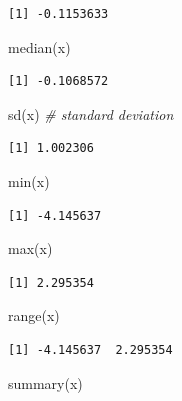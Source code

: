 \documentclass[
]{book}
\newenvironment{Shaded}{\begin{snugshade}}{\end{snugshade}}
\newcommand{\CommentTok}[1]{\textcolor[rgb]{0.56,0.35,0.01}{\textit{#1}}}
\newcommand{\FunctionTok}[1]{\textcolor[rgb]{0.00,0.00,0.00}{#1}}
\newcommand{\NormalTok}[1]{#1}
\begin{document}
\begin{verbatim}
[1] -0.1153633
\end{verbatim}

\begin{Shaded}
\begin{Highlighting}[]
\FunctionTok{median}\NormalTok{(x)}
\end{Highlighting}
\end{Shaded}

\begin{verbatim}
[1] -0.1068572
\end{verbatim}

\begin{Shaded}
\begin{Highlighting}[]
\FunctionTok{sd}\NormalTok{(x) }\CommentTok{\# standard deviation}
\end{Highlighting}
\end{Shaded}

\begin{verbatim}
[1] 1.002306
\end{verbatim}

\begin{Shaded}
\begin{Highlighting}[]
\FunctionTok{min}\NormalTok{(x)}
\end{Highlighting}
\end{Shaded}

\begin{verbatim}
[1] -4.145637
\end{verbatim}

\begin{Shaded}
\begin{Highlighting}[]
\FunctionTok{max}\NormalTok{(x)}
\end{Highlighting}
\end{Shaded}

\begin{verbatim}
[1] 2.295354
\end{verbatim}

\begin{Shaded}
\begin{Highlighting}[]
\FunctionTok{range}\NormalTok{(x)}
\end{Highlighting}
\end{Shaded}

\begin{verbatim}
[1] -4.145637  2.295354
\end{verbatim}

\begin{Shaded}
\begin{Highlighting}[]
\FunctionTok{summary}\NormalTok{(x)}
\end{Highlighting}
\end{Shaded}
\end{document}
